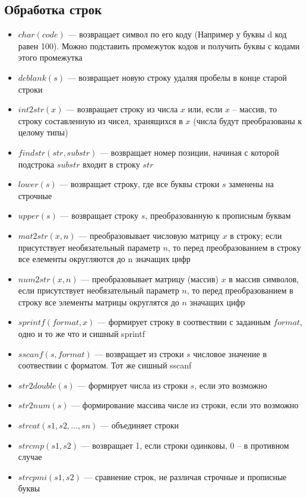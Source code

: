 \documentclass[12pt, a4paper,oneside]{book}
\begin{document}
\subsection{Обработка строк}
\begin{itemize}
  \item{$char(code)$ --- возвращает символ по его коду (Например у буквы d код равен 100). Можно подставить промежуток кодов и получить буквы с кодами этого промежутка}
  \item{$deblank(s)$ --- возвращает новую строку удаляя пробелы в конце старой строки}
  \item{$int2str(x)$ --- возвращает строку из числа $x$ или, если $x$ -- массив, то строку составленную из чисел, хранящихся в $x$ (числа будут преобразованы к целому типы)}
  \item{$findstr(str, substr)$ --- возвращает номер позиции, начиная с которой подстрока $substr$ входит в строку $str$}
  \item{$lower(s)$ --- возвращает строку, где все буквы строки $s$ заменены на строчные}
  \item{$upper(s)$ --- возвращает строку $s$, преобразованную к прописным буквам}
  \item{$mat2str(x, n)$ --- преобразовывает числовую матрицу $x$ в строку; если присутствует необязательный параметр $n$, то перед преобразованием в строку все елементы округляются до n значащих цифр}
  \item{$num2str(x, n)$ --- преобразовывает матрицу (массив) $x$ в массив символов, если присутствует необязательный параметр $n$, то перед преобразованием в строку все элементы матрицы округлятся до $n$ значащих цифр}
  \item{$sprintf(format, x)$ --- формирует строку в соотвествии с заданным $format$, одно и то же что и сишный sprintf}
  \item{$sscanf(s, format)$ --- возвращает из строки $s$ числовое значение в соотвествии с форматом. Тот же сишный sscanf}
  \item{$str2double(s)$ --- формирует числа из строки $s$, если это возможно}
  \item{$str2num(s)$ --- формирование массива числе из строки, если это возможно}
  \item{$strcat(s1, s2, ..., sn)$ --- объединяет строки}
  \item{$strcmp(s1, s2)$ --- возвращает 1, если строки одинковы, 0 -- в противном случае}
  \item{$strcpmi(s1, s2)$ --- сравнение строк, не различая строчные и прописные буквы}

\end{itemize}
\end{document}
